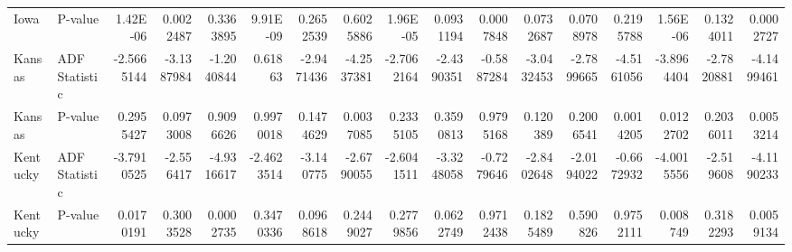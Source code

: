 \begin{table}
{\begin{tabular}{llrrrrrrrrrrrrrrr}
            Iowa        & P-value       & 1.42E-06                            & 0.0022487                & 0.3363895                & 9.91E-09                 & 0.2652539                  & 0.6025886                & 1.96E-05                   & 0.0931194               & 0.0007848               & 0.0732687                  & 0.0708978                  & 0.2195788                 & 1.56E-06                  & 0.1324011                        & 0.0002727                        \\
            Kansas      & ADF Statistic & -2.5665144                          & -3.1387984               & -1.2040844               & 0.61863                  & -2.9471436                 & -4.2537381               & -2.7062164                 & -2.4390351              & -0.5887284              & -3.0432453                 & -2.7899665                 & -4.5161056                & -3.8964404                & -2.7820881                       & -4.1499461                       \\
            Kansas      & P-value       & 0.2955427                           & 0.0973008                & 0.9096626                & 0.9970018                & 0.1474629                  & 0.0037085                & 0.2335105                  & 0.3590813               & 0.9795168               & 0.120389                   & 0.2006541                  & 0.0014205                 & 0.0122702                 & 0.2036011                        & 0.0053214                        \\
            Kentucky    & ADF Statistic & -3.7910525                          & -2.556417                & -4.9316617               & -2.4623514               & -3.140775                  & -2.6790055               & -2.6041511                 & -3.3248058              & -0.7279646              & -2.8402648                 & -2.0194022                 & -0.6672932                & -4.0015556                & -2.519608                        & -4.1190233                       \\
            Kentucky    & P-value       & 0.0170191                           & 0.3003528                & 0.0002735                & 0.3470336                & 0.0968618                  & 0.2449027                & 0.2779856                  & 0.0622749               & 0.9712438               & 0.1825489                  & 0.590826                   & 0.9752111                 & 0.008749                  & 0.3182293                        & 0.0059134                        \\

\end{tabular}}
\end{table}

